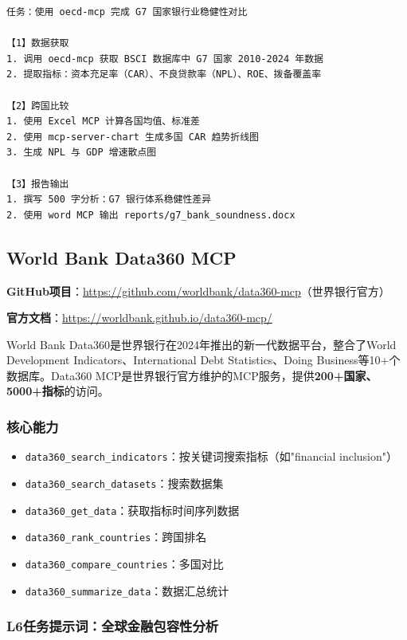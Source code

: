 \begin{lstlisting}
任务：使用 oecd-mcp 完成 G7 国家银行业稳健性对比

【1】数据获取
1. 调用 oecd-mcp 获取 BSCI 数据库中 G7 国家 2010-2024 年数据
2. 提取指标：资本充足率（CAR）、不良贷款率（NPL）、ROE、拨备覆盖率

【2】跨国比较
1. 使用 Excel MCP 计算各国均值、标准差
2. 使用 mcp-server-chart 生成多国 CAR 趋势折线图
3. 生成 NPL 与 GDP 增速散点图

【3】报告输出
1. 撰写 500 字分析：G7 银行体系稳健性差异
2. 使用 word MCP 输出 reports/g7_bank_soundness.docx
\end{lstlisting}

\subsection{World Bank Data360 MCP}

\textbf{GitHub项目}：\url{https://github.com/worldbank/data360-mcp}（世界银行官方）

\textbf{官方文档}：\url{https://worldbank.github.io/data360-mcp/}

World Bank Data360是世界银行在2024年推出的新一代数据平台，整合了World Development Indicators、International Debt Statistics、Doing Business等10+个数据库。Data360 MCP是世界银行官方维护的MCP服务，提供\textbf{200+国家、5000+指标}的访问。

\subsubsection{核心能力}

\begin{itemize}[leftmargin=2em]
  \item \texttt{data360\_search\_indicators}：按关键词搜索指标（如"financial inclusion"）
  \item \texttt{data360\_search\_datasets}：搜索数据集
  \item \texttt{data360\_get\_data}：获取指标时间序列数据
  \item \texttt{data360\_rank\_countries}：跨国排名
  \item \texttt{data360\_compare\_countries}：多国对比
  \item \texttt{data360\_summarize\_data}：数据汇总统计
\end{itemize}

\subsubsection{L6任务提示词：全球金融包容性分析}

